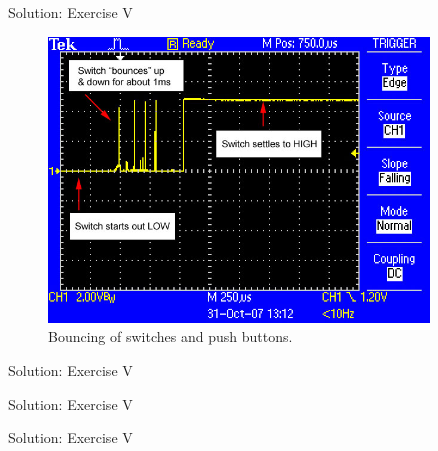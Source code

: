\begin{frame}{Solution: Exercise V}
    \begin{figure}
        \includegraphics[width=0.9\textwidth]{images/microcontroller/actuators/switch_bounce.jpg}
        \caption{Bouncing of switches and push buttons.}
    \end{figure}
\end{frame}

\begin{frame}{Solution: Exercise V}
    \begin{listing}[H]
        \caption{Solution for Exercise V (press and release).}
        \label{lst:arduino:exercise:5:solution:press_release}
    \end{listing}
\end{frame}

\begin{frame}{Solution: Exercise V}
    \begin{listing}[H]
        \caption{Solution for Exercise V (click, debounced; \texttt{setup()}).}
        \label{lst:arduino:exercise:5:solution:click:debounce:setup}
    \end{listing}
\end{frame}

\begin{frame}{Solution: Exercise V}
    \begin{listing}[H]
        \caption{Solution for Exercise V (click, debounced; \texttt{loop()}).}
        \label{lst:arduino:exercise:5:solution:click:debounce:loop}
    \end{listing}
\end{frame}

